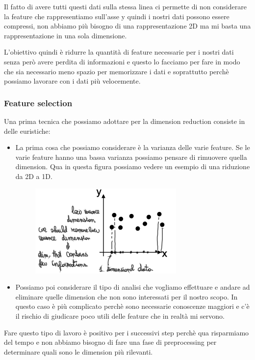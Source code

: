 \documentclass[14pt]{extreport}
\begin{document}
Il fatto di avere tutti questi dati sulla stessa linea ci permette di non considerare la feature che rappresentiamo sull'asse y
quindi i nostri dati possono essere compressi, non abbiamo più bisogno di una rappresentazione 2D ma mi basta una rappresentazione in una
sola dimensione.

L'obiettivo quindi è ridurre la quantità di feature necessarie per i nostri dati senza però avere perdita di informazioni e questo
lo facciamo per fare in modo che sia necessario meno spazio per memorizzare i dati e soprattutto perchè possiamo lavorare con i dati 
più velocemente.


\subsubsection{Feature selection}

Una prima tecnica che possiamo adottare per la dimension reduction consiste in delle euristiche:

\begin{itemize}
\item La prima cosa che possiamo considerare è la varianza delle varie feature. Se le varie feature hanno una bassa varianza
possiamo pensare di rimuovere quella dimension.
Qua in questa figura possiamo vedere un esempio di una riduzione da 2D a 1D.
\begin{figure}[H]
\centering
\includegraphics[width=0.7\linewidth]{436.jpeg}
\end{figure}
\item Possiamo poi considerare il tipo di analisi che vogliamo effettuare e andare ad eliminare quelle dimension che non 
sono interessati per il nostro scopo. In questo caso è più complicato perchè sono necessarie conoscenze maggiori e c'è il rischio di 
giudicare poco utili delle feature che in realtà mi servono.
\end{itemize} 

Fare questo tipo di lavoro è positivo per i successivi step perchè qua risparmiamo del tempo e non abbiamo bisogno di fare una fase di
preprocessing per determinare quali sono le dimension più rilevanti.
\end{document}
